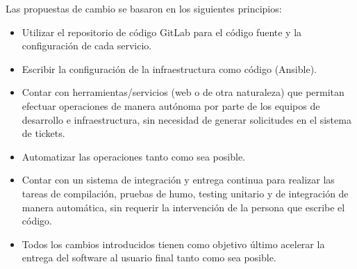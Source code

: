 Las propuestas de cambio se basaron en los siguientes principios:
%
\begin{itemize}
\item Utilizar el repositorio de código GitLab para el código fuente y
  la configuración de cada servicio.
\item Escribir la configuración de la infraestructura como código
  (Ansible).
\item Contar con herramientas/servicios (web o de otra naturaleza) que
  permitan efectuar operaciones de manera autónoma por parte de los
  equipos de desarrollo e infraestructura, sin necesidad de generar
  solicitudes en el sistema de tickets.
\item Automatizar las operaciones tanto como sea posible.
\item Contar con un sistema de integración y entrega continua para
  realizar las tareas de compilación, pruebas de humo, testing
  unitario y de integración de manera automática, sin requerir la
  intervención de la persona que escribe el código.
\item Todos los cambios introducidos tienen como objetivo último
  acelerar la entrega del software al usuario final tanto como sea
  posible.
\end{itemize}
%
